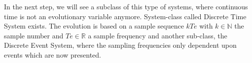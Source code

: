 In the next step, we will see a subclass of this type of systems, where continuous time is not an evolutionary variable anymore. System-class called Discrete Time System exists. The evolution is based on a sample sequence $kTe$ with $k\in \mathbb{N}$ the sample number and $Te \in \mathbb{R}$ a sample frequency and another sub-class, the Discrete Event System, where the sampling frequencies only dependent upon events which are now presented.